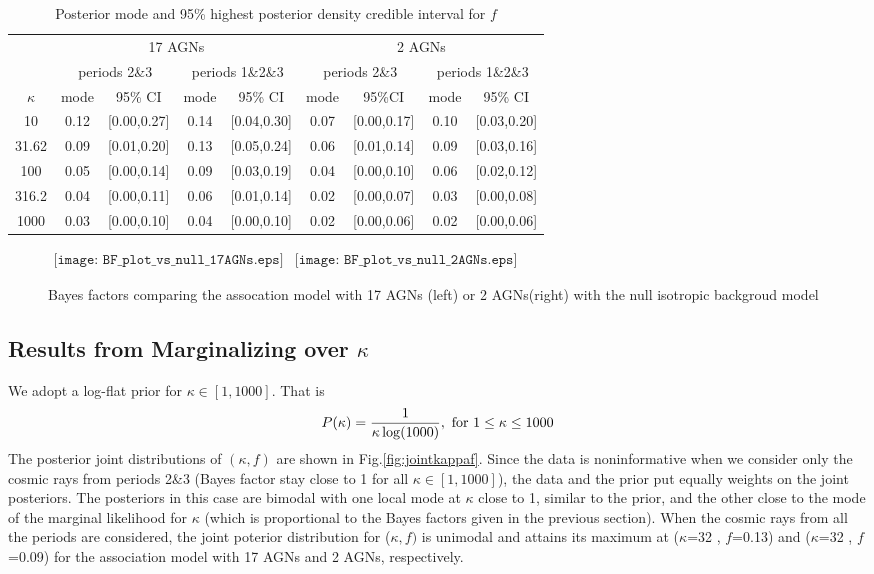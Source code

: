 \documentclass[dvips,aoas]{imsart}
\newcommand{\be}{\begin{equation}}
\newcommand{\ee}{\end{equation}}
\begin{document}
\begin{table}[h]
\begin{tabular}{|c|c |c| c| c| c|c|c|c|}
\hline
& \multicolumn{4}{|c|}{17 AGNs} & \multicolumn{4}{|c|}{2 AGNs}\\
\cline{2-9}
& \multicolumn{2}{|c|}{periods 2\&3} & \multicolumn{2}{|c|}{periods 1\&2\&3}& \multicolumn{2}{|c|}{periods 2\&3} & \multicolumn{2}{|c|}{periods 1\&2\&3}\\
\cline{2-9}
$\kappa$&mode&{95\% CI} & mode&{95\% CI}& mode&{95\%CI} & mode&{95\% CI}\\
\hline
10 & 0.12  & [0.00,0.27] & 0.14 &[0.04,0.30] & 0.07 & [0.00,0.17] & 0.10 &[0.03,0.20]\\
31.62 & 0.09 & [0.01,0.20] & 0.13 &[0.05,0.24] & 0.06 &[0.01,0.14] & 0.09 & [0.03,0.16]\\
100 & 0.05 & [0.00,0.14] & 0.09 & [0.03,0.19] & 0.04 & [0.00,0.10] & 0.06 & [0.02,0.12]\\
316.2 & 0.04 & [0.00,0.11] & 0.06 & [0.01,0.14] & 0.02 & [0.00,0.07] & 0.03 & [0.00,0.08]\\
1000 & 0.03 & [0.00,0.10] & 0.04 & [0.00,0.10] & 0.02 & [0.00,0.06] & 0.02 & [0.00,0.06]\\
\hline
\end{tabular}
\caption{Posterior mode and 95\% highest posterior density credible interval for $f$}\label{tab:sumpostf}
\end{table}

\begin{figure}
\centerline{$
\begin{array}{cc}
\texttt{[image: BF\_plot\_vs\_null\_17AGNs.eps]} &
\texttt{[image: BF\_plot\_vs\_null\_2AGNs.eps]}
\end{array}$}
\caption{Bayes factors comparing the assocation model with 17 AGNs (left) or 2 AGNs(right) with the null
isotropic backgroud model}
\label{fig:BFplot}
\end{figure}

\subsection{Results from Marginalizing over $\kappa$}
We adopt a log-flat prior for $\kappa\in[1,1000]$. That is
\be
P(\kappa) = {1\over\kappa\log(1000)}, \mbox{ for } 1\leq\kappa\leq1000
\ee
The posterior joint distributions of $(\kappa,f)$ are shown 
in Fig.\ref{fig:jointkappaf}. Since the data is noninformative when 
we consider only the cosmic rays from periods 2\&3 (Bayes factor stay 
close to 1 for all $\kappa\in[1,1000]$), the data and the prior put equally 
weights on the joint posteriors. The posteriors in this case are bimodal with one 
local mode at $\kappa$ close to 1, similar to the prior, and the other close to
the mode of the marginal likelihood for $\kappa$ (which is proportional 
to the Bayes factors given in the previous section).  When the cosmic rays 
from all the periods are considered, the joint poterior distribution
for ($\kappa,f)$ is unimodal and attains its maximum at 
($\kappa$=32 , $f$=0.13) and ($\kappa$=32 , $f$=0.09) 
for the association model with 17 AGNs and 2 AGNs, respectively.
\end{document}
